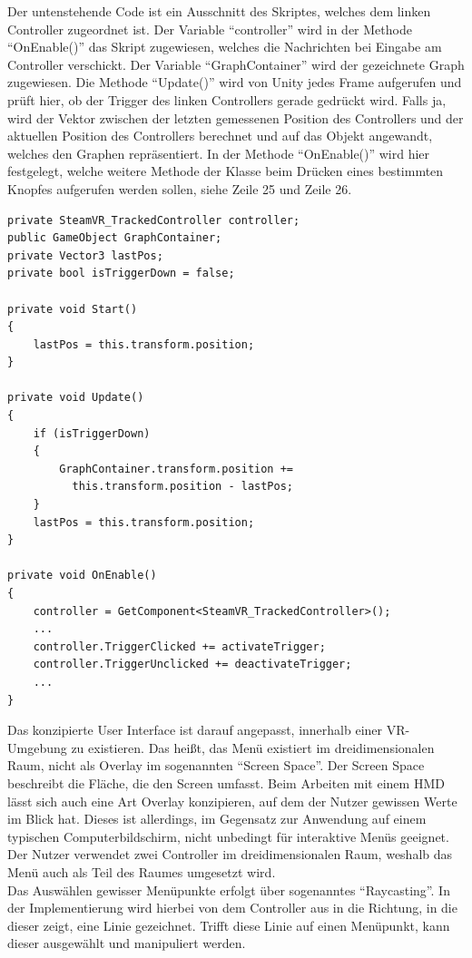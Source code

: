 \documentclass[12pt, a4paper]{article}
\begin{document}
Der untenstehende Code ist ein Ausschnitt des Skriptes, welches dem linken Controller zugeordnet ist. Der Variable "`controller"' wird in der Methode "`OnEnable()"' das Skript zugewiesen, welches die Nachrichten bei Eingabe am Controller verschickt. Der Variable "`GraphContainer"' wird der gezeichnete Graph zugewiesen. Die Methode "`Update()"' wird von Unity jedes Frame aufgerufen und prüft hier, ob der Trigger des linken Controllers gerade gedrückt wird. Falls ja, wird der Vektor zwischen der letzten gemessenen Position des Controllers und der aktuellen Position des Controllers berechnet und auf das Objekt angewandt, welches den Graphen repräsentiert. In der Methode "`OnEnable()"' wird hier festgelegt, welche weitere Methode der Klasse beim Drücken eines bestimmten Knopfes aufgerufen werden sollen, siehe Zeile 25 und Zeile 26.
\begin{lstlisting}
private SteamVR_TrackedController controller;
public GameObject GraphContainer;
private Vector3 lastPos;
private bool isTriggerDown = false;

private void Start()
{
	lastPos = this.transform.position;
}

private void Update()
{
	if (isTriggerDown)
    {
    	GraphContainer.transform.position +=
          this.transform.position - lastPos;
    }
	lastPos = this.transform.position;
}

private void OnEnable()
{
	controller = GetComponent<SteamVR_TrackedController>();
	...
	controller.TriggerClicked += activateTrigger;
	controller.TriggerUnclicked += deactivateTrigger;
	...
}
\end{lstlisting}
Das konzipierte User Interface ist darauf angepasst, innerhalb einer VR-Umgebung zu existieren. Das heißt, das Menü existiert im dreidimensionalen Raum, nicht als Overlay im sogenannten "`Screen Space"'. Der Screen Space beschreibt die Fläche, die den Screen umfasst. Beim Arbeiten mit einem HMD lässt sich auch eine Art Overlay konzipieren, auf dem der Nutzer gewissen Werte im Blick hat. Dieses ist allerdings, im Gegensatz zur Anwendung auf einem typischen Computerbildschirm, nicht unbedingt für interaktive Menüs geeignet. Der Nutzer verwendet zwei Controller im dreidimensionalen Raum, weshalb das Menü auch als Teil des Raumes umgesetzt wird.\\

Das Auswählen gewisser Menüpunkte erfolgt über sogenanntes "`Raycasting"'. In der Implementierung wird hierbei von dem Controller aus in die Richtung, in die dieser zeigt, eine Linie gezeichnet. Trifft diese Linie auf einen Menüpunkt, kann dieser ausgewählt und manipuliert werden.\\
\end{document}
